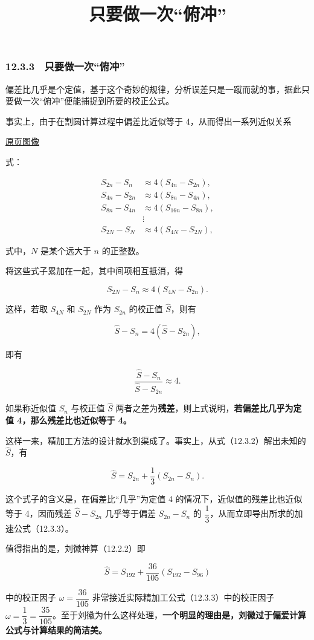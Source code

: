 \documentclass[
  10pt,
  fontset=fandol]{ctexart}
\title{只要做一次``俯冲''}
\author{}
\date{}
\begin{document}
\maketitle

\subsubsection{12.3.3　只要做一次``俯冲''}\label{ux53eaux8981ux505aux4e00ux6b21ux4fefux51b2}

偏差比几乎是个定值，基于这个奇妙的规律，分析误差只是一蹴而就的事，据此只要做一次``俯冲''便能捕捉到所要的校正公式。

事实上，由于在割圆计算过程中偏差比近似等于 4，从而得出一系列近似关系

\href{../../source-images/pdf-300.jpeg}{原页图像}

式：

\[
\begin{aligned}
S_{2n}-S_n&\approx4(S_{4n}-S_{2n}),\\
S_{4n}-S_{2n}&\approx4(S_{8n}-S_{4n}),\\
S_{8n}-S_{4n}&\approx4(S_{16n}-S_{8n}),\\
&\vdots\\
S_{2N}-S_N&\approx4(S_{4N}-S_{2N}),
\end{aligned}
\]

式中，\(N\) 是某个远大于 \(n\) 的正整数。

将这些式子累加在一起，其中间项相互抵消，得

\[
S_{2N}-S_n\approx4(S_{4N}-S_{2n}).
\]

这样，若取 \(S_{4N}\) 和 \(S_{2N}\) 作为 \(S_{2n}\) 的校正值 \(\widehat S\)，则有

\[
\widehat S-S_n=4(\widehat S-S_{2n}),
\tag{12.3.2}
\]

即有

\[
\frac{\widehat S-S_n}{\widehat S-S_{2n}}\approx4.
\]

如果称近似值 \(S_n\) 与校正值 \(\widehat S\) 两者之差为\textbf{残差}，则上式说明，\textbf{若偏差比几乎为定值 4，那么残差比也近似等于 4。}

这样一来，精加工方法的设计就水到渠成了。事实上，从式（12.3.2）解出未知的 \(\widehat S\)，有

\[
\widehat S=S_{2n}+\frac{1}{3}(S_{2n}-S_n).
\tag{12.3.3}
\]

这个式子的含义是，在偏差比``几乎''为定值 4 的情况下，近似值的残差比也近似等于 4，因而残差 \(\widehat S-S_{2n}\) 几乎等于偏差 \(S_{2n}-S_n\) 的 \(\dfrac13\)，从而立即导出所求的加速公式（12.3.3）。

值得指出的是，刘徽神算（12.2.2）即

\[
\widehat S=S_{192}+\frac{36}{105}(S_{192}-S_{96})
\]

中的校正因子 \(\omega=\dfrac{36}{105}\) 非常接近实际精加工公式（12.3.3）中的校正因子 \(\omega=\dfrac13=\dfrac{35}{105}\)。至于刘徽为什么这样处理，\textbf{一个明显的理由是，刘徽过于偏爱计算公式与计算结果的简洁美。}
\end{document}
